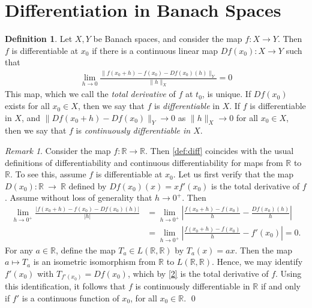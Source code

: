 \documentclass[12pt,reqno]{amsart}
\numberwithin{equation}{section}  %
\numberwithin{figure}{section}
\newcommand{\rr}{\mathbb{R}}
\theoremstyle{plain}
\theoremstyle{definition}
\newtheorem{definition}{Definition}
\theoremstyle{remark}
\newtheorem{remark}{Remark}
\begin{document}
\section{Differentiation in Banach Spaces}
\begin{definition}
	\label{def:diff}
	Let $X,Y$ be Banach spaces, and consider the map $f: X \to Y$.
	Then $f$ is differentiable at $x_0$ if there
	is a continuous linear map $Df(x_0): X \to Y$ such that
	\begin{equation}
		\label{diff-limit}
		\begin{split}
			\lim_{h \to 0} \frac{\|f(x_0+ h) - f(x_0) -
			Df(x_0)(h) \|_Y}{\|h\|_{X}} = 0
		\end{split}
	\end{equation}
	This map, which we call the \emph{total derivative} of $f$ at $t_0$, is 
	unique. If $Df(x_0)$ exists for all $x_0 \in X$,
	then we say that $f$ is
	\emph{differentiable} in $X$. If $f$ is differentiable in $X$, and 
	$\|Df(x_0 + h) - Df(x_0) \|_Y \to 0$ as $\|h\|_{X} \to 0$ for all $x_0 \in X$,
	then we say that $f$ is \emph{continuously differentiable in $X$}. 	
\end{definition}
  \begin{framed}
	\begin{remark}
		\label{rem:usual-diff}
		Consider the map $f: \rr \to \rr$. Then \autoref{def:diff} 
		coincides with the usual definitions of
		differentiability and continuous differentiability for maps
		from $\rr $ to $\rr$.
		To see this, assume $f$ is differentiable at $x_0$.
		Let us first verify that the map  $D(x_0): \rr ~\to~\rr$
		defined by $Df(x_0)(x) =
		xf'(x_0)$ is the total derivative of $f$. Assume without loss of generality
		that $h \to 0^+$. Then
		\begin{equation}
			\label{2}
			\begin{split}
				 \lim_{h \to 0^+} \frac{| f( x_0 + h) - f(x_0) -
				Df(x_0)(h) |}{|h|}
				 & = \lim_{h\to 0^+} \left |\frac{f(x_0+h) -
				f(x_0)}{h} - \frac{Df(x_0)(h)}{h}  \right |
				\\
				 & =\lim_{h \to 0^+} \left |\frac{f(x_0+h) - f(x_0)}{h} -
				f'(x_0) \right | = 0.
			\end{split}
		\end{equation}
%
%
For any $a \in \rr$, define the map $T_{a} \in L(\rr , \rr)$ by
$T_{a}(x) = ax$. Then the map $a \mapsto T_a$ is an isometric
isomorphism from $\rr$ to $L( \rr, \rr)$. Hence, 
we may identify $f'(x_0)$ with $T_{f'(x_0)} = Df(x_0)$,
which by \eqref{2} is the total derivative of $f$.  Using this identification,
it follows that $f$ is continuously
differentiable in $\rr$ if and only if $f'$ is a continuous function of
$x_0$, for all $x_0 \in \rr$. \qed
%
\end{remark}
\end{framed}
\end{document}
